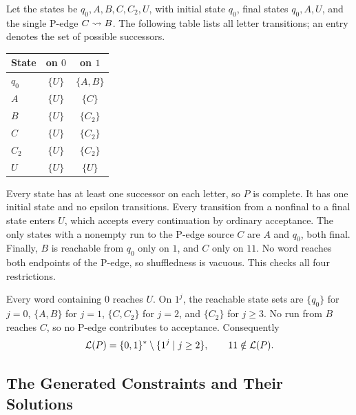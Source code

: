 Let the states be $q_0,A,B,C,C_2,U$, with initial state $q_0$,
final states $q_0,A,U$, and the single P-edge $C\rightsquigarrow B$.
The following table lists all letter transitions; an entry denotes the
set of possible successors.
\begin{center}
\begin{tabular}{@{}lcc@{}}
\toprule
State & on $0$ & on $1$\\\midrule
$q_0$ & $\{U\}$ & $\{A,B\}$\\
$A$   & $\{U\}$ & $\{C\}$\\
$B$   & $\{U\}$ & $\{C_2\}$\\
$C$   & $\{U\}$ & $\{C_2\}$\\
$C_2$ & $\{U\}$ & $\{C_2\}$\\
$U$   & $\{U\}$ & $\{U\}$\\\bottomrule
\end{tabular}
\end{center}
Every state has at least one successor on each letter, so $P$ is complete.
It has one initial state and no epsilon transitions. Every transition
from a nonfinal to a final state enters $U$, which accepts every
continuation by ordinary acceptance. The only states with a nonempty
run to the P-edge source $C$ are $A$ and $q_0$, both final. Finally,
$B$ is reachable from $q_0$ only on $1$, and $C$ only on $11$.
No word reaches both endpoints of the P-edge, so shuffledness is
vacuous. This checks all four restrictions.

Every word containing $0$ reaches $U$. On $1^j$, the reachable state
sets are $\{q_0\}$ for $j=0$, $\{A,B\}$ for $j=1$,
$\{C,C_2\}$ for $j=2$, and $\{C_2\}$ for $j\ge3$.
No run from $B$ reaches $C$, so no P-edge contributes to acceptance.
Consequently
\[
 \mathcal{L}(P)=\{0,1\}^*\setminus\{1^j\mid j\ge2\},
 \qquad 11\notin\mathcal{L}(P).
\]

\subsection{The Generated Constraints and Their Solutions}

